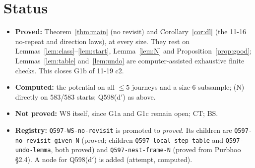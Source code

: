 \documentclass[11pt]{article}
\theoremstyle{definition}\newtheorem{definition}[theorem]{Definition}\newtheorem{remark}[theorem]{Remark}
\begin{document}
\section*{Status}
\begin{itemize}
\item \textbf{Proved:} Theorem~\ref{thm:main} (no revisit) and Corollary~\ref{cor:dl} (the 11-16 no-repeat and direction laws), at every size. They rest on Lemmas~\ref{lem:class}--\ref{lem:start}, Lemma~\ref{lem:N} and Proposition~\ref{prop:good}; Lemmas~\ref{lem:table} and~\ref{lem:undo} are computer-assisted exhaustive finite checks. This closes G1b of 11-19 c2.
\item \textbf{Computed:} the potential on all $\le5$ journeys and a size-6 subsample; (N) directly on 583/583 starts; Q598(d$'$) as above.
\item \textbf{Not proved:} WS itself, since G1a and G1c remain open; CT; BS.
\item \textbf{Registry:} \texttt{Q597-WS-no-revisit} is promoted to \emph{proved}. Its children are \texttt{Q597-no-revisit-given-N} (proved; children \texttt{Q597-local-step-table} and \texttt{Q597-undo-lemma}, both proved) and \texttt{Q597-nest-frame-N} (proved from Purbhoo \S2.4). A node for Q598(d$'$) is added (attempt, computed).
\end{itemize}
\end{document}
